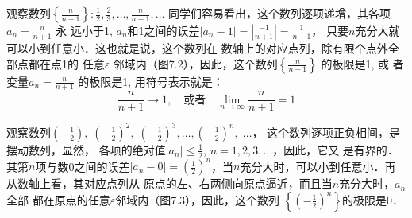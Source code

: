 \begin{example}
观察数列$\left\{\frac{n}{n+1}\right\}: \frac{1}{2},\frac{2}{3},\ldots,\frac{n}{n+1},\ldots$
同学们容易看出，这个数列逐项递增，其各项$a_n=\frac{n}{n+1}$
永
远小于1, $a_n$和1之间的误差$|a_n-1|=\left|\frac{-1}{n+1}\right|=\frac{1}{n+1}$，
只要$n$充分大就可以小到任意小．这也就是说，这个数列在
数轴上的对应点列，除有限个点外全部点都在点1的 任意$\varepsilon$
邻域内（图7.2），因此，这个数列$\left\{\frac{n}{n+1}\right\}$
的极限是1, 或
者变量$a_n=\frac{n}{n+1}$
的极限是1, 用符号表示就是：
\[\frac{n}{n+1}\to 1,\quad \text{或者}\quad \lim_{n\to\infty}\frac{n}{n+1}=1\]
\begin{figure}[htp]
    \centering
{}  
    \caption{}
\end{figure}
\end{example}

\begin{example}
    观察数列$\left(-\frac{1}{2}\right),\; \left(-\frac{1}{2}\right)^2,\; \left(-\frac{1}{2}\right)^3,\ldots,\left(-\frac{1}{2}\right)^n,\;\ldots$， 这个数列逐项正负相间，是摆动数列，显然，
    各项的绝对值$|a_n|\le\frac{1}{2}$, $n=1,2,3,\ldots$，因此，它又
    是有界的．其第$n$项与数0之间的误差$|a_n-0|=\left(\frac{1}{2}\right)^n$，当$n$充分大时，可以小到任意小．再从数轴上看，其对应点列从
    原点的左、右两侧向原点逼近，而且当$n$充分大时，$a_n$全部
    都在原点的任意$\varepsilon$邻域内（图7.3），因此，这个数列
$\left\{\left(-\frac{1}{2}\right)^n\right\}$的极限是0．
\begin{figure}[htp]
    \centering
    \caption{}
\end{figure}
\end{example}

